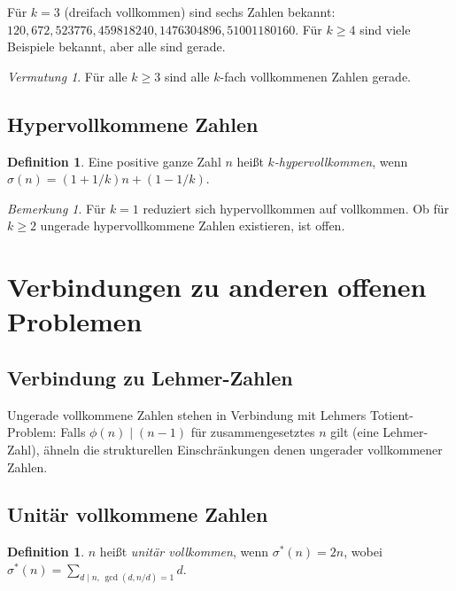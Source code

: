 \documentclass[12pt,a4paper]{amsart}
\theoremstyle{definition}
\newtheorem{definition_de}[theorem]{Definition}
\theoremstyle{remark}
\newtheorem{bemerkung}[theorem]{Bemerkung}
\newtheorem{vermutung}[theorem]{Vermutung}
\begin{document}
Für $k = 3$ (dreifach vollkommen) sind sechs Zahlen bekannt:
$120, 672, 523776, 459818240, 1476304896, 51001180160$.
Für $k \geq 4$ sind viele Beispiele bekannt, aber alle sind gerade.

\begin{vermutung}
Für alle $k \geq 3$ sind alle $k$-fach vollkommenen Zahlen gerade.
\end{vermutung}

\subsection{Hypervollkommene Zahlen}

\begin{definition_de}
Eine positive ganze Zahl $n$ heißt \emph{$k$-hypervollkommen}, wenn
$\sigma(n) = (1+1/k)n + (1-1/k)$.
\end{definition_de}

\begin{bemerkung}
Für $k = 1$ reduziert sich hypervollkommen auf vollkommen.
Ob für $k \geq 2$ ungerade hypervollkommene Zahlen existieren, ist offen.
\end{bemerkung}

\section{Verbindungen zu anderen offenen Problemen}

\subsection{Verbindung zu Lehmer-Zahlen}

Ungerade vollkommene Zahlen stehen in Verbindung mit Lehmers Totient-Problem:
Falls $\phi(n) \mid (n-1)$ für zusammengesetztes $n$ gilt (eine Lehmer-Zahl),
ähneln die strukturellen Einschränkungen denen ungerader vollkommener Zahlen.

\subsection{Unitär vollkommene Zahlen}

\begin{definition_de}
$n$ heißt \emph{unitär vollkommen}, wenn $\sigma^*(n) = 2n$, wobei
$\sigma^*(n) = \sum_{d \mid n,\, \gcd(d,n/d)=1} d$.
\end{definition_de}
\end{document}
